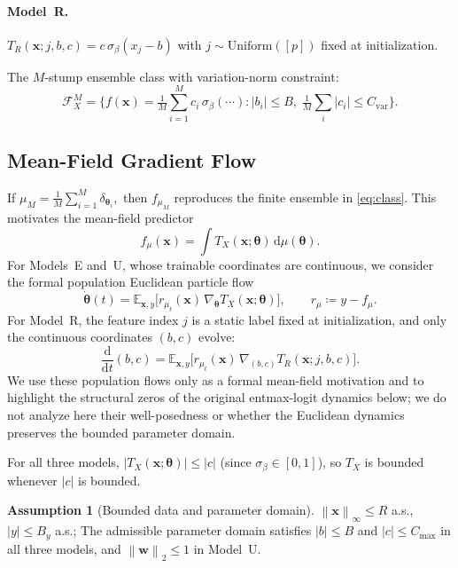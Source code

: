 \documentclass[11pt,a4paper]{article}
\theoremstyle{definition}
\newtheorem{assumption}[theorem]{Assumption}
\theoremstyle{remark}
\newcommand{\E}{\mathbb{E}}
\newcommand{\vtheta}{\boldsymbol{\theta}}
\newcommand{\vw}{\mathbf{w}}
\newcommand{\vx}{\mathbf{x}}
\newcommand{\dd}{\mathrm{d}}
\newcommand{\dmu}{\dd\mu}
\newcommand{\norm}[1]{\left\|#1\right\|}
\begin{document}
\paragraph{Model~R.}
$T_R(\vx;j,b,c)
= c\,\sigma_\beta(x_j - b)$
with $j \sim \mathrm{Uniform}([p])$ fixed at
initialization.

\medskip\noindent
The $M$-stump ensemble class with
variation-norm constraint:
\begin{equation}
  \mathcal{F}_X^M
  = \Big\{
  f(\vx) = \tfrac{1}{M}\textstyle\sum_{i=1}^M
  c_i\,\sigma_\beta(\cdots)
  : |b_i| \le B,\;
  \tfrac{1}{M}\textstyle\sum_i |c_i|
  \le C_{\mathrm{var}}
  \Big\}.
  \label{eq:class}
\end{equation}


\subsection{Mean-Field Gradient Flow}

If
\(
  \mu_M
  =
  \tfrac{1}{M}\sum_{i=1}^M \delta_{\vtheta_i},
\)
then \(f_{\mu_M}\) reproduces the finite ensemble
in \eqref{eq:class}. This motivates the
mean-field predictor
\[
  f_\mu(\vx)
  = \int T_X(\vx;\vtheta)\,\dmu(\vtheta).
\]
For Models~E and~U, whose trainable coordinates
are continuous, we consider the formal
population Euclidean particle flow
\begin{equation}
  \dot{\vtheta}(t)
  = \E_{\vx,y}\!\big[
  r_{\mu_t}(\vx)\,
  \nabla_{\!\vtheta} T_X(\vx;\vtheta)
  \big],
  \qquad
  r_\mu \coloneqq y - f_\mu.
  \label{eq:ode}
\end{equation}
For Model~R, the feature index \(j\) is a static
label fixed at initialization, and only the
continuous coordinates \((b,c)\) evolve:
\[
  \frac{\dd}{\dd t}(b,c)
  =
  \E_{\vx,y}\!\big[
    r_{\mu_t}(\vx)\,
    \nabla_{(b,c)} T_R(\vx;j,b,c)
  \big].
\]
We use these population flows only as a formal
mean-field motivation and to highlight the
structural zeros of the original entmax-logit
dynamics below; we do not analyze here their
well-posedness or whether the Euclidean dynamics
preserves the bounded parameter domain.

For all three models,
$|T_X(\vx;\vtheta)| \le |c|$
(since $\sigma_\beta \in [0,1]$), so
$T_X$ is bounded whenever $|c|$ is bounded.

\begin{assumption}[Bounded data and parameter domain]
  \label{asm:bounded}
  $\norm{\vx}_\infty \le R$ a.s.,
  $|y| \le B_y$ a.s.;
  The admissible parameter domain satisfies
  $|b| \le B$ and
  $|c| \le C_{\max}$ in all three models, and
  $\norm{\vw}_2 \le 1$ in Model~U.
\end{assumption}
\end{document}
